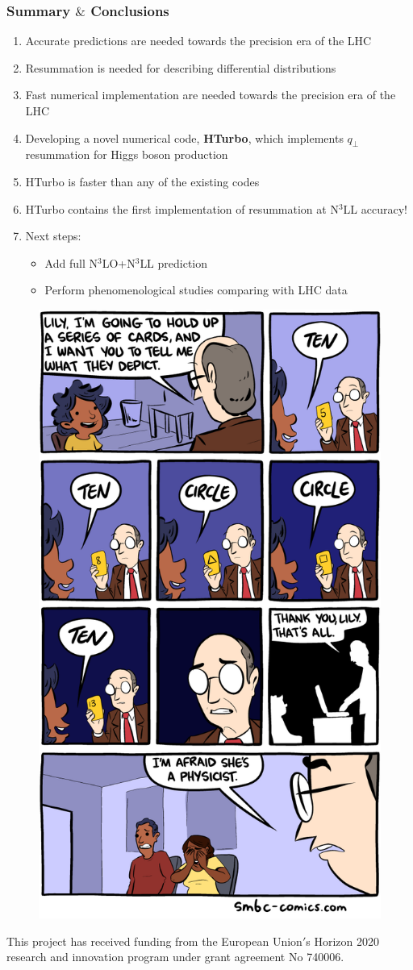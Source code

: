\documentclass[aspectratio=43]{beamer}
\begin{document}
\begin{frame}
	
	\frametitle{Summary $\&$ Conclusions}
	
	\footnotesize
	
	\vspace{2.0 cm}
	
	\begin{enumerate}
		\item Accurate predictions are needed towards the precision era of the LHC
		\item Resummation is needed for describing differential distributions
		\item Fast numerical implementation are needed towards the precision era of the LHC
		\item Developing a novel numerical code, \textbf{HTurbo}, which implements $q_{\perp}$ resummation for Higgs boson production
		\item HTurbo is {\color{blue} faster than any of the existing codes}
		\item HTurbo contains the {\color{blue} first implementation of resummation at N$^{3}$LL accuracy!}
			
		\item Next steps: 
		\begin{itemize}
			\item Add full {\color{blue}N$^{3}$LO+N$^{3}$LL} prediction
			\item Perform phenomenological studies comparing with LHC data
		\end{itemize}
		
	\end{enumerate}

	\vspace{2.0 cm}

\end{frame}

\begin{frame}

	\footnotesize
	

	\begin{figure}
		\includegraphics[width = 3.5 cm]{plots/final/physicist.png}
	\end{figure}		

	{\small \color{blue} \footnotesize This project has received funding from the European Union$'$s Horizon 2020 research and innovation program under grant agreement No 740006.}

\end{frame}
\end{document}
